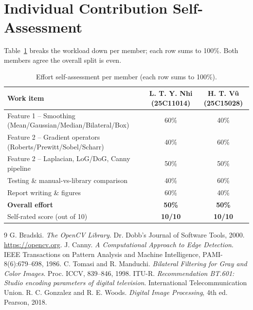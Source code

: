 \documentclass[a4paper,11pt]{article}
\begin{document}
\appendix
\section{Individual Contribution Self-Assessment}
\label{app:effort}
Table~\ref{tab:effort} breaks the workload down per member; each row sums to
100\%. Both members agree the overall split is even.

\begin{table}[H]
\centering
\caption{Effort self-assessment per member (each row sums to 100\%).}
\label{tab:effort}
\begin{tabular}{l c c}
\toprule
\textbf{Work item} & \textbf{L. T. Y. Nhi (25C11014)} & \textbf{H. T. Vũ (25C15028)} \\
\midrule
Feature 1 -- Smoothing (Mean/Gaussian/Median/Bilateral/Box) & 60\% & 40\% \\
Feature 2 -- Gradient operators (Roberts/Prewitt/Sobel/Scharr) & 40\% & 60\% \\
Feature 2 -- Laplacian, LoG/DoG, Canny pipeline              & 50\% & 50\% \\
Testing \& manual-vs-library comparison                       & 40\% & 60\% \\
Report writing \& figures                                     & 60\% & 40\% \\
\midrule
\textbf{Overall effort}      & \textbf{50\%}  & \textbf{50\%} \\
Self-rated score (out of 10) & \textbf{10/10} & \textbf{10/10} \\
\bottomrule
\end{tabular}
\end{table}

\begin{thebibliography}{9}
 G. Bradski. \emph{The OpenCV Library}. Dr. Dobb's Journal of
Software Tools, 2000. \url{https://opencv.org}.
 J. Canny. \emph{A Computational Approach to Edge Detection}. IEEE
Transactions on Pattern Analysis and Machine Intelligence, PAMI-8(6):679--698, 1986.
 C. Tomasi and R. Manduchi. \emph{Bilateral Filtering for Gray
and Color Images}. Proc. ICCV, 839--846, 1998.
 ITU-R. \emph{Recommendation BT.601: Studio encoding parameters of
digital television}. International Telecommunication Union.
 R. C. Gonzalez and R. E. Woods. \emph{Digital Image
Processing}, 4th ed. Pearson, 2018.
\end{thebibliography}
\end{document}
